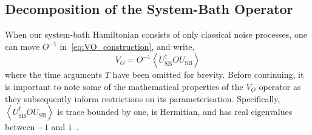 \documentclass[12pt]{iopart}
\begin{document}
\subsection{Decomposition of the System-Bath Operator \label{subsec:decomposition_of_vo}}
When our system-bath Hamiltonian consists of only classical noise processes, one can move $O^{-1}$ in~\cref{eq:VO_construction}, and write,
\begin{equation} \label{eq:VO_construction_1}
 V_O=O^{-1}\left\langle U_{\mathrm{SB}}^{\dagger} O U_{\mathrm{SB}}\right\rangle
\end{equation}
where the time arguments $T$ have been omitted for brevity. Before continuing, it is important to note some of the mathematical properties of the $V_O$ operator as they subsequently inform restrictions on its parameterisation. Specifically, $\left\langle U_{\mathrm{SB}}^{\dagger} O U_{\mathrm{SB}}\right\rangle$ is trace bounded by one, is Hermitian, and has real eigenvalues between $-1$ and $1$~\cite{youssry2020characterization}.

\end{document}
